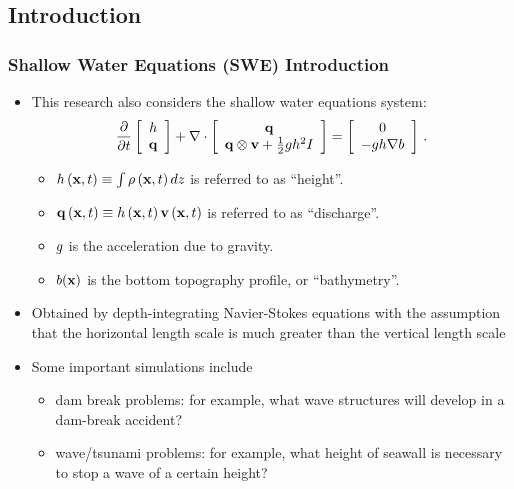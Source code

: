 \documentclass{beamer} \useoutertheme{infolines}
\begin{document}
\subsection{Introduction}
\begin{frame}
\frametitle{Shallow Water Equations (SWE) Introduction}

\begin{itemize}
  \item This research also considers the shallow water equations system:
    \begin{equation}
      \frac{\partial }{\partial t}\left[\begin{array}{c}h\\\mathbf{q}\end{array}\right]
        + \nabla\cdot\left[\begin{array}{c}\mathbf{q}\\
          \mathbf{q}\otimes\mathbf{v} + \frac{1}{2}gh^2 I
          \end{array}\right]
        = \left[\begin{array}{c}0\\-gh\nabla b\end{array}
    \right] \,.
    \end{equation}
    \begin{itemize}
      \item $h\left(\mathbf{x},t\right) \equiv \int\rho\left(\mathbf{x},t\right) dz$ is referred to as ``height''.
      \item $\mathbf{q}\left(\mathbf{x},t\right) \equiv h\left(\mathbf{x},t\right)\mathbf{v}\left(\mathbf{x},t\right)$ is referred to
        as ``discharge''.
      \item $g$ is the acceleration due to gravity.
      \item $b(\mathbf{x})$ is the bottom topography profile,
        or ``bathymetry''.
    \end{itemize}
  \item Obtained by depth-integrating Navier-Stokes equations with the
    assumption that the horizontal length scale is much greater than the
    vertical length scale
  \item Some important simulations include
    \begin{itemize}
      \item \textcolor{secondarycolorheavy}{dam break problems}: for example, what wave
        structures will develop in a dam-break accident?
      \item \textcolor{secondarycolorheavy}{wave/tsunami problems}: for example, what height
        of seawall is necessary to stop a wave of a certain height?
    \end{itemize}
\end{itemize}

\end{frame}
\end{document}
